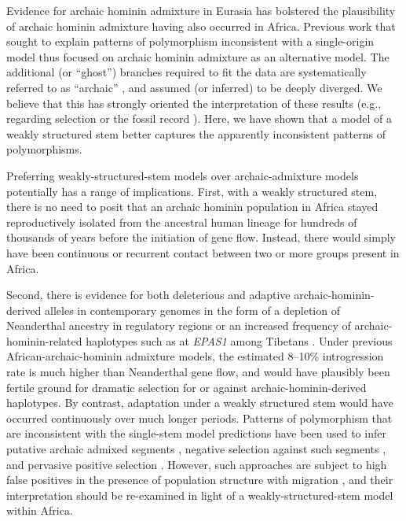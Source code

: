 \documentclass[]{article}
\begin{document}
Evidence for archaic hominin admixture in Eurasia has bolstered the
plausibility of archaic hominin admixture having also occurred in Africa.
Previous work that sought to explain patterns of polymorphism inconsistent with
a single-origin model thus focused on archaic hominin admixture as an
alternative model. The additional (or ``ghost'') branches required to fit the
data are systematically referred to as ``archaic''
\citep{Plagnol2006-lt,Hammer2011-bx,Hey2018-pw,Ragsdale2019-nt,
Lorente-Galdos2019-vz,Durvasula2020-td}, and assumed (or inferred) to be deeply
diverged. We believe that this has strongly oriented the interpretation of
these results (e.g., regarding selection \cite{Wall2019-ao} or the fossil
record \cite{Grun2020-su}). Here, we have shown that a model of a weakly
structured stem better captures the apparently inconsistent patterns of
polymorphisms.

Preferring weakly-structured-stem models over archaic-admixture models
potentially has a range of implications. First, with a weakly structured stem,
there is no need to posit that an archaic hominin population in Africa stayed
reproductively isolated from the ancestral human lineage for hundreds of thousands of
years before the initiation of gene flow. Instead, there would simply have
been continuous or recurrent contact between two or more groups present in
Africa. 

Second, there is evidence for both deleterious and adaptive
archaic-hominin-derived alleles in contemporary genomes in the form of a
depletion of Neanderthal ancestry in regulatory regions \citep{Petr2019-xo} or
an increased frequency of archaic-hominin-related haplotypes such as at
\emph{EPAS1} among Tibetans \citep{Zhang2021-xx}. Under previous
African-archaic-hominin admixture models, the estimated 8--10\% introgression rate is
much higher than Neanderthal gene flow, and would have plausibly been fertile
ground for dramatic selection for or against archaic-hominin-derived
haplotypes\citep{Wall2019-ao}. By contrast, adaptation under a weakly
structured stem would have occurred continuously over much longer periods.
Patterns of polymorphism that are inconsistent with the single-stem model
predictions have been used to infer putative archaic admixed segments
\citep{Plagnol2006-lt,Hsieh2016-gk,Wall2019-ao,Durvasula2020-td}, negative
selection against such segments \citep{Wall2019-ao}, and pervasive positive
selection \citep{Schrider2017-kl}. However, such approaches are subject to high
false positives in the presence of population structure with migration
\citep{Petr2019-xo}, and their interpretation should be re-examined in light of
a weakly-structured-stem model within Africa. 
\end{document}
